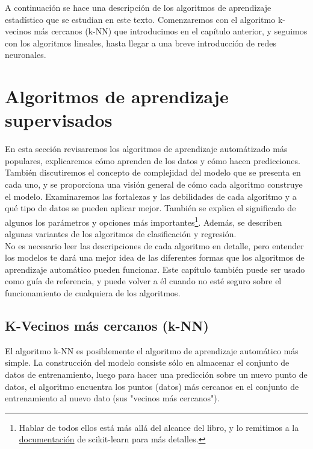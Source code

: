{A continuación se hace una descripción de los algoritmos de aprendizaje estadístico que se estudian en este texto. Comenzaremos con el algoritmo k-vecinos más cercanos (k-NN) que introducimos  en el capítulo anterior, y  seguimos con los algoritmos lineales, hasta llegar a una breve introducción de redes neuronales. 


\section{Algoritmos de aprendizaje supervisados}
	

En esta sección  revisaremos los algoritmos de aprendizaje automátizado más populares,  explicaremos cómo
aprenden de los datos y cómo hacen predicciones. También discutiremos el concepto de complejidad del modelo que se presenta en cada uno, y se proporciona una visión general de cómo cada algoritmo construye el modelo. Examinaremos las fortalezas y las debilidades de cada algoritmo y a qué tipo de datos se pueden aplicar mejor. También se explica el significado de algunos los parámetros y opciones más importantes\footnote{Hablar de todos ellos está más allá del alcance del libro, y lo remitimos a la \href{https://scikit-learn.org/stable/index.html}{\color{vino} documentación} de {\ttfamily scikit-learn}
para más detalles.}.  Además, se    describen algunas  variantes de los algoritmos de  clasificación y regresión.\\



No es necesario leer las descripciones de cada algoritmo en detalle, pero
entender los modelos te dará una mejor idea de las diferentes formas que los algoritmos de aprendizaje automático pueden funcionar. Este capítulo también puede ser usado como guía de referencia, y puede volver a él cuando no esté seguro sobre el funcionamiento de cualquiera de los algoritmos.



\subsection{K-Vecinos más cercanos (k-NN)} %

El algoritmo k-NN es posiblemente el algoritmo de aprendizaje automático más simple. La construcción del modelo consiste sólo en almacenar el conjunto de datos de entrenamiento, luego  para hacer una predicción sobre  un nuevo punto de datos, el algoritmo encuentra los puntos (datos) más cercanos en el conjunto  de entrenamiento al nuevo dato (sus "vecinos más cercanos").



}
